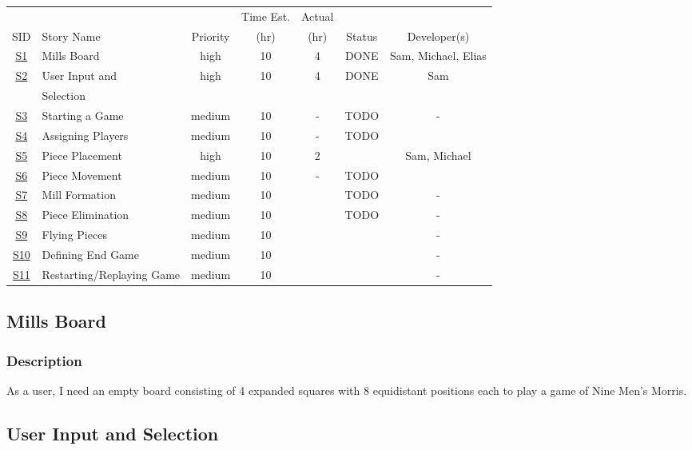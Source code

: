 \documentclass[11pt]{article}
\begin{document}
\begin{center}
\begin{tabular}{|c|m{3.5cm}|c|c|c|c|c|}
 &  &  & Time Est. & Actual &  & \\
SID & Story Name & Priority & (hr) & (hr) & Status & Developer(s)\\
\hline
\hyperref[sec:org211e8c0]{S1} & Mills Board & high & 10 & 4 & DONE & Sam, Michael, Elias\\
\hline
\hyperref[sec:org96cf1f7]{S2} & User Input and & high & 10 & 4 & DONE & Sam\\
 & Selection &  &  &  &  & \\
\hline
\hyperref[sec:orga4d2de6]{S3} & Starting a Game & medium & 10 & - & TODO & -\\
\hline
\hyperref[sec:org41fc180]{S4} & Assigning Players & medium & 10 & - & TODO & \\
\hline
\hyperref[sec:org1c7cdcf]{S5} & Piece Placement & high & 10 & 2 &  & Sam, Michael\\
\hline
\hyperref[sec:orgfd3c1b4]{S6} & Piece Movement & medium & 10 & - & TODO & \\
\hline
\hyperref[sec:org90d71af]{S7} & Mill Formation & medium & 10 &  & TODO & -\\
\hline
\hyperref[sec:org8164721]{S8} & Piece Elimination & medium & 10 &  & TODO & -\\
\hline
\hyperref[sec:org5cbdd28]{S9} & Flying Pieces & medium & 10 &  &  & -\\
\hline
\hyperref[sec:orgfa9575d]{S10} & Defining End Game & medium & 10 &  &  & -\\
\hline
\hyperref[sec:org25e3e41]{S11} & Restarting/Replaying Game & medium & 10 &  &  & -\\
\end{tabular}
\end{center}


\subsection{Mills Board}
\label{sec:org211e8c0}
\subsubsection*{Description}
\label{sec:org6f95184}
As a user, I need an empty board consisting of 4 expanded squares with 8 equidistant positions
each to play a game of Nine Men's Morris.
\subsection{User Input and Selection}
\label{sec:org96cf1f7}
\end{document}

